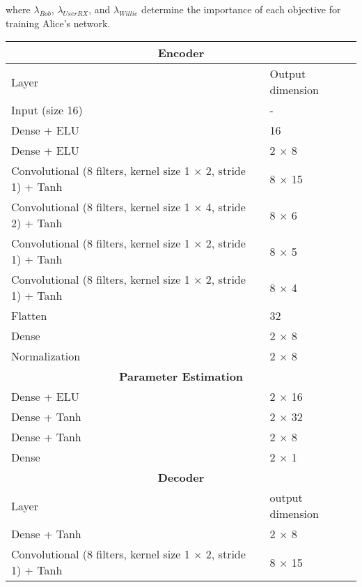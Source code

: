 where \(\lambda_{Bob}\), \(\lambda_{UserRX}\), and \(\lambda_{Willie}\) determine the importance of each objective for training Alice's network.
\iffalse Algorithm (?) summarizes our approach for optimizing the whole system. \fi
\begin{table}[bp!]
	\begin{adjustbox}{width=0.85\columnwidth,center}
		\begin{tabular}{|l|l|} 
			\hline
			\multicolumn{2}{|c|}{\textbf{Encoder}} 															\\
			\hline
			Layer 																	&	Output dimension	\\
			\hline
			Input (size 16)      												&	-    	 		    \\ 
			Dense + ELU          													&	16					\\
			Dense + ELU   															&	2 $\times$ 8		\\
			Convolutional (8 filters, kernel size 1 $\times$ 2, stride 1) + Tanh 	&   8 $\times$ 15		\\
			Convolutional (8 filters, kernel size 1 $\times$ 4, stride 2) + Tanh 	&   8 $\times$ 6		\\
			Convolutional (8 filters, kernel size 1 $\times$ 2, stride 1) + Tanh 	&   8 $\times$ 5		\\
			Convolutional (8 filters, kernel size 1 $\times$ 2, stride 1) + Tanh 	&   8 $\times$ 4		\\
			Flatten															 		&   32					\\
			Dense																	&	2 $\times$ 8		\\
			Normalization															&	2 $\times$ 8		\\
			\hline   
			\hline												
			\multicolumn{2}{|c|}{\textbf{Parameter Estimation}} 											\\
			\hline
			Dense + ELU																&	2 $\times$ 16		\\
			Dense + Tanh															&	2 $\times$ 32		\\
			Dense + Tanh															&	2 $\times$ 8		\\
			Dense																	&	2 $\times$	1		\\
			\hline
			\hline
			\multicolumn{2}{|c|}{\textbf{Decoder}}															\\
			\hline
			Layer 																	&	output dimension	\\
			\hline
			Dense + Tanh          													&	2 $\times$ 8		\\
			Convolutional (8 filters, kernel size 1 $\times$ 2, stride 1) + Tanh 	&   8 $\times$ 15		\\

\end{tabular}
\end{adjustbox}
\end{table}
